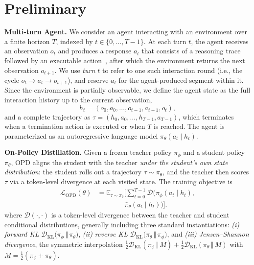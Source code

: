 \documentclass[11pt]{article}
\begin{document}
\section{Preliminary}
\label{sec:preliminary}

\textbf{Multi-turn Agent.}
We consider an agent interacting with an environment over a finite horizon $T$, indexed by $t \in \{0, \dots, T-1\}$.
At each turn $t$, the agent receives an observation $o_t$ and produces a response $a_t$ that consists of a reasoning trace followed by an executable action~\citep{react}, after which the environment returns the next observation $o_{t+1}$.
We use \emph{turn $t$} to refer to one such interaction round (i.e., the cycle $o_t \!\to\! a_t \!\to\! o_{t+1}$), and reserve $a_t$ for the agent-produced segment within it.
Since the environment is partially observable, we define the agent state as the full interaction history up to the current observation,
\begin{equation}
    h_t = (o_0, a_0, \dots, o_{t-1}, a_{t-1}, o_t),
    \label{eq:history}
\end{equation}
and a complete trajectory as $\tau = (h_0, a_0, \dots, h_{T-1}, a_{T-1})$, which terminates when a termination action is executed or when $T$ is reached.
The agent is parameterized as an autoregressive language model $\pi_\theta(a_t \mid h_t)$. 

\textbf{On-Policy Distillation.}
Given a frozen teacher policy $\pi_\phi$ and a student policy $\pi_\theta$, OPD aligns the student with the teacher \emph{under the student's own state distribution}: the student rolls out a trajectory $\tau \sim \pi_\theta$, and the teacher then scores $\tau$ via a token-level divergence at each visited state. The training objective is
\begin{equation}
\begin{aligned}
\mathcal{L}_{\mathrm{OPD}}(\theta)
&= \mathbb{E}_{\tau \sim \pi_\theta}
\Bigg[
\sum_{t=0}^{T-1}
\mathcal{D}\Big(
\pi_\phi(a_t \mid h_t), \\
&\qquad\qquad
\bar{\pi}_\theta(a_t \mid h_t)
\Big)
\Bigg].
\end{aligned}
\label{eq:opd}
\end{equation}
where $\mathcal{D}(\cdot,\cdot)$ is a token-level divergence between the teacher and student conditional distributions, generally including three standard instantiations:
\emph{(i) forward KL} $\mathcal{D}_{\mathrm{KL}}\!\big(\pi_\phi \,\Vert\, \pi_\theta\big)$, 
\emph{(ii) reverse KL} $\mathcal{D}_{\mathrm{KL}}\!\big(\pi_\theta \,\Vert\, \pi_\phi\big)$, 
and \emph{(iii) Jensen--Shannon divergence}, the symmetric interpolation $\tfrac{1}{2}\mathcal{D}_{\mathrm{KL}}(\pi_\phi \,\Vert\, M) + \tfrac{1}{2}\mathcal{D}_{\mathrm{KL}}(\pi_\theta \,\Vert\, M)$ with $M = \tfrac{1}{2}(\pi_\phi + \pi_\theta)$.
\end{document}
